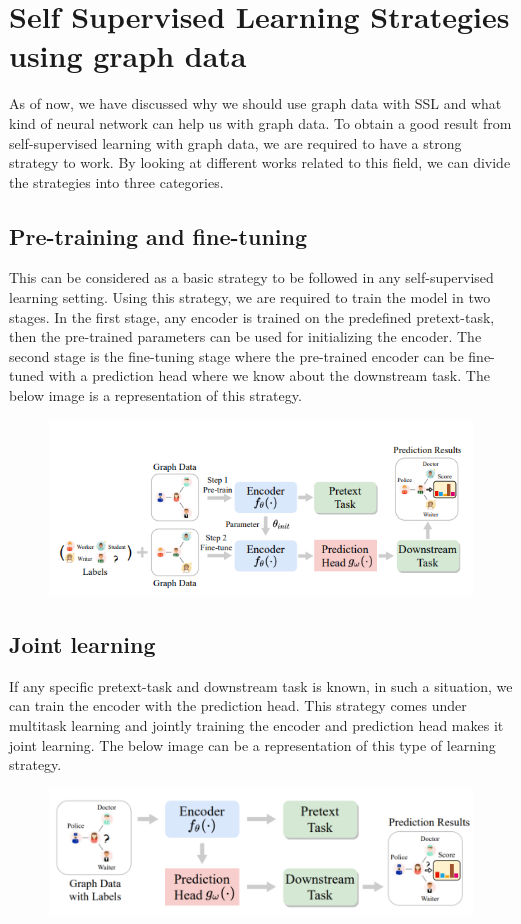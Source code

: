 \documentclass[a4paper,11pt]{report}
\begin{document}
\chapter{Self Supervised Learning Strategies using graph data}

As of now, we have discussed why we should use graph data with SSL and what kind of neural network can help us with graph data. To obtain a good result from self-supervised learning with graph data, we are required to have a strong strategy to work. By looking at different works related to this field, we can divide the strategies into three categories.  

\section{Pre-training and fine-tuning}
This can be considered as a basic strategy to be followed in any self-supervised learning setting. Using this strategy, we are required to train the model in two stages. In the first stage, any encoder is trained on the predefined pretext-task, then the pre-trained parameters can be used for initializing the encoder. The second stage is the fine-tuning stage where the pre-trained encoder can be fine-tuned with a prediction head where we know about the downstream task. The below image is a representation of this strategy.
\begin{figure}[h]
	\centering
	\hspace{21pt}
	\includegraphics[width=.70\linewidth]{ssgnn1.png}
	\label{fig:he.jpg}
\end{figure}
\section{Joint learning}
If any specific pretext-task and downstream task is known, in such a situation, we can train the encoder with the prediction head. This strategy comes under multitask learning and jointly training the encoder and prediction head makes it joint learning. The below image can be a representation of this type of learning strategy.
\begin{figure}[h]
	\centering
	\hspace{21pt}
	\includegraphics[width=.70\linewidth]{ssgnn2.png}
	\label{fig:he.jpg}
\end{figure}
\end{document}
